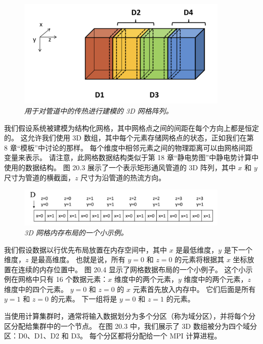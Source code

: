 \begin{figure}[H]
	\centering
	\includegraphics[width=0.9\textwidth]{figs/F20.3.png}
	\caption{\textit{用于对管道中的传热进行建模的 3D 网格阵列。}}
\end{figure}

我们假设系统被建模为结构化网格，其中网格点之间的间距在每个方向上都是恒定的。 
这允许我们使用 3D 数组，其中每个元素存储网格点的状态，正如我们在第 8 章“模板”中讨论的那样。 
每个维度中相邻元素之间的物理距离可以由网格间距变量来表示。 
请注意，此网格数据结构类似于第 18 章“静电势图”中静电势计算中使用的数据结构。 
图 20.3 展示了一个表示矩形通风管道的 3D 阵列，其中 $x$ 和 $y$ 尺寸为管道的横截面，$z$ 尺寸为沿管道的热流方向。

\begin{figure}[H]
	\centering
	\includegraphics[width=0.9\textwidth]{figs/F20.4.png}
	\caption{\textit{3D 网格内存布局的一个小示例。}}
\end{figure}

我们假设数据以行优先布局放置在内存空间中，其中 $x$ 是最低维度，$y$ 是下一个维度，$z$ 是最高维度。 
也就是说，所有 $y=0$ 和 $z=0$ 的元素将根据其 $x$ 坐标放置在连续的内存位置中。 图 20.4 显示了网格数据布局的一个小例子。 
这个小示例在网格中只有 16 个数据元素：$x$ 维度中的两个元素，$y$ 维度中的两个元素，$z$ 维度中的四个元素。 
$y=0$ 和 $z=0$ 的 $x$ 元素首先放入内存中。 它们后面是所有 $y=1$ 和 $z=0$ 的元素。 
下一组将是 $y=0$ 和 $z=1$ 的元素。

当使用计算集群时，通常将输入数据划分为多个分区（称为域分区），并将每个分区分配给集群中的一个节点。 
在图 20.3 中，我们展示了 3D 数组被分为四个域分区：D0、D1、D2 和 D3。 每个分区都将分配给一个 MPI 计算进程。

